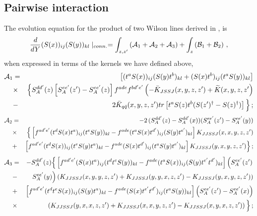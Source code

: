 \documentclass[11pt,a4paper]{article}
\def\beq{\begin{equation}}
\def\eeq{\end{equation}}
\def\beq{\begin{equation}}
\def\eeq{\end{equation}}
\begin{document}
 \subsection{Pairwise interaction }
The evolution equation for the product of two Wilson lines derived in \cite{BClast},  is
\beq
\frac{d}{dY}(S(x))_{ij}(S(y))_{kl}\mid_{conn.}=\int_{z,z^\prime} \left({\cal A}_1+{\cal A}_2+{\cal A}_3\right) +\int_z \left( {\cal B}_1+{\cal B}_2\right)\,,
\eeq
when expressed in terms of the kernels we have defined above, 
\begin{eqnarray}
{\cal A}_1&=& 
\left[(t^{a}S(x))_{ij}(S(y)t^{b})_{kl}+(S(x)t^{b})_{ij}(t^{a}S(y))_{kl}\right] 
\nonumber \\
&\times&\Big\{S_{A}^{dd^{\prime}}(z)\left[S_{A}^{ee^{\prime}}(z^{\prime})-S_{A}^{ee^{\prime}}(z)\right] f^{ade}f^{bd^{\prime}e^{\prime}}\left (- \bar K_{JSSJ}(x,y,z,z^{\prime})+
\widetilde{K}(x,y,z,z^{\prime}\right)\nonumber \\
&-&2\bar K_{q\bar{q}}(x,y,z,z^{\prime}) tr\left[t^{a}S(z)t^{b}(S(z^{\prime})^{\dagger}-S(z)^{\dagger})\right]\Big\}\,;
\end{eqnarray}
\begin{eqnarray}
{\cal A}_2&=& {- 2}\,(S_{A}^{dd^{\prime}}(z)-S_{A}^{dd^{\prime}}(x))(S_{A}^{ee^{\prime}}(z^{\prime})-S_{A}^{ee^{\prime}}(y))\nonumber \\
&\times& \Big\{\left[f^{ad^{\prime}e^{\prime}}(t^{d}S(x)t^{a})_{ij}(t^{e}S(y))_{kl}-f^{ade}(t^{a}S(x)t^{d^{\prime}})_{ij}(S(y)t^{e^{\prime}})_{kl}\right]K_{JJSSJ}(x,x,y,z,z^{\prime})\nonumber \\
&+&\left[f^{ad^{\prime}e^{\prime}}(t^{d}S(x))_{ij}(t^{e}S(y)t^{a})_{kl}-f^{ade}(S(x)t^{d^{\prime}})_{ij}(t^{a}S(y)t^{e^{\prime}})_{kl}\right]K_{JJSSJ}(y,x,y,z,z^{\prime})\Big\}\,; \nonumber \\
\end{eqnarray}
\begin{eqnarray}
{\cal A}_3&=&-
S_{A}^{dd^{\prime}}(z)\Big\{ \left[f^{ad^{\prime}e^{\prime}}(S(x)t^{a})_{ij}(t^{d}t^{e}S(y))_{kl}-f^{ade}(t^{a}S(x))_{ij}(S(y)t^{e^{\prime}}t^{d^{\prime}})_{kl}\right]
\left(S_{A}^{ee^{\prime}}(z^{\prime})\right. \nonumber \\ 
&-&\left. S_{A}^{ee^{\prime}}(y)\right)
\left( K_{JJSSJ}(x,y,y,z,z^{\prime})+K_{JJSSJ}(y,y,x,z,z^{\prime})-K_{JJSSJ}(y,x,y,z,z^{\prime})\right)\nonumber \\
&+& \left[f^{ad^{\prime}e^{\prime}}(t^{d}t^{e}S(x))_{ij}(S(y)t^{a})_{kl}-f^{ade}(S(x)t^{e^{\prime}}t^{d^{\prime}})_{ij}(t^{a}S(y))_{kl}\right]\left(S_{A}^{ee^{\prime}}(z^{\prime})-S_{A}^{ee^{\prime}}(x)\right)\nonumber \\
&\times&\left( K_{JJSSJ}(y,x,x,z,z^{\prime})+K_{JJSSJ}(x,x,y,z,z^{\prime})-K_{JJSSJ}(x,y,x,z,z^{\prime})\right)\Big\}\,;
\end{eqnarray}
\end{document}
